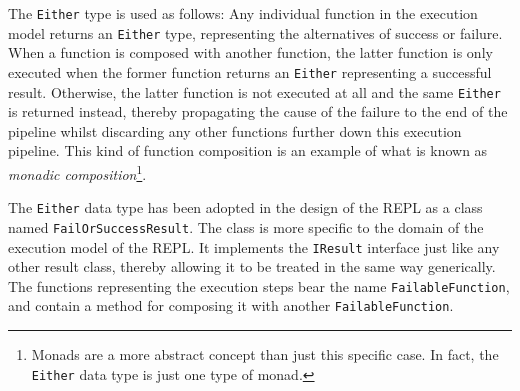 The \texttt{Either} type is used as follows: Any individual function in the
execution model returns an \texttt{Either} type, representing the
alternatives of success or failure. When a function is composed with
another function, the latter function is only executed when the former
function returns an \texttt{Either} representing a successful
result. Otherwise, the latter function is not
executed at all and the same \texttt{Either} is returned instead, thereby
propagating the cause of the failure to the end of the pipeline whilst
discarding any other functions further down this execution pipeline.
This kind of function composition is an example of what is known as \textit{monadic
  composition}\footnote{Monads are a more abstract concept than just
  this specific case. In fact, the \texttt{Either} data type is just one
  type of monad.}.

The \texttt{Either} data type has been adopted in the design of the REPL as
a class named \texttt{FailOrSuccessResult}. The class is more specific to
the domain of the execution model of the REPL. It implements the
\texttt{IResult} interface just like any other result class, thereby
allowing it to be treated in the same way generically. The functions
representing the execution steps bear the name \texttt{FailableFunction},
and contain a method for composing it with another
\texttt{FailableFunction}.

